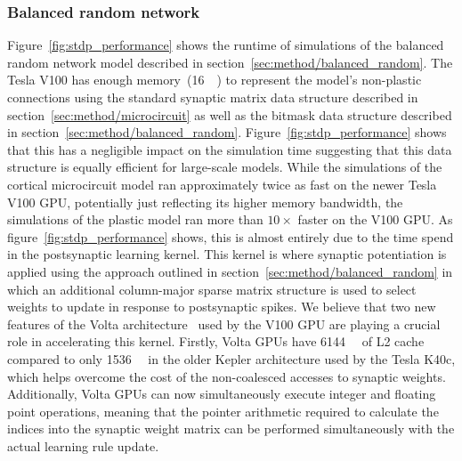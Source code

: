 \documentclass[utf8]{frontiersSCNS} %
\begin{document}
\subsubsection{Balanced random network}
Figure~\ref{fig:stdp_performance} shows the runtime of simulations of the balanced random network model described in section~\ref{sec:method/balanced_random}.
The Tesla V100 has enough memory~(\SI{16}{\giga\byte}) to represent the model's non-plastic connections using the standard synaptic matrix data structure described in section~\ref{sec:method/microcircuit} as well as the bitmask data structure described in section~\ref{sec:method/balanced_random}.
Figure~\ref{fig:stdp_performance} shows that this has a negligible impact on the simulation time suggesting that this data structure is equally efficient for large-scale models.
While the simulations of the cortical microcircuit model ran approximately twice as fast on the newer Tesla V100 GPU, potentially just reflecting its higher memory bandwidth, the simulations of the plastic model ran more than $10\times$ faster on the V100 GPU.
As figure~\ref{fig:stdp_performance} shows, this is almost entirely due to the time spend in the postsynaptic learning kernel.
This kernel is where synaptic potentiation is applied using the approach outlined in section~\ref{sec:method/balanced_random} in which an additional column-major sparse matrix structure is used to select weights to update in response to postsynaptic spikes.
We believe that two new features of the Volta architecture~\citep{Nvidia2017} used by the V100 GPU are playing a crucial role in accelerating this kernel.
Firstly, Volta GPUs have \SI{6144}{\kibi\byte} of L2 cache compared to only \SI{1536}{\kibi\byte} in the older Kepler architecture used by the Tesla K40c, which helps overcome the cost of the non-coalesced accesses to synaptic weights.
Additionally, Volta GPUs can now simultaneously execute integer and floating point operations, meaning that the pointer arithmetic required to calculate the indices into the synaptic weight matrix can be performed simultaneously with the actual learning rule update.
\end{document}
